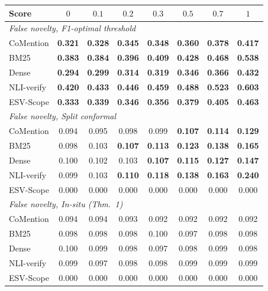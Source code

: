 \setlength{\tabcolsep}{2.5pt}
\begin{tabular}{lccccccc}
\toprule
Score & $0$ & $0.1$ & $0.2$ & $0.3$ & $0.5$ & $0.7$ & $1$ \\
\midrule
\multicolumn{8}{l}{\emph{False novelty, F1-optimal threshold}} \\
CoMention & \textbf{0.321} & \textbf{0.328} & \textbf{0.345} & \textbf{0.348} & \textbf{0.360} & \textbf{0.378} & \textbf{0.417} \\
BM25 & \textbf{0.383} & \textbf{0.384} & \textbf{0.396} & \textbf{0.409} & \textbf{0.428} & \textbf{0.468} & \textbf{0.538} \\
Dense & \textbf{0.294} & \textbf{0.299} & \textbf{0.314} & \textbf{0.319} & \textbf{0.346} & \textbf{0.366} & \textbf{0.432} \\
NLI-verify & \textbf{0.420} & \textbf{0.433} & \textbf{0.446} & \textbf{0.459} & \textbf{0.488} & \textbf{0.523} & \textbf{0.603} \\
ESV-Scope & \textbf{0.333} & \textbf{0.339} & \textbf{0.346} & \textbf{0.356} & \textbf{0.379} & \textbf{0.405} & \textbf{0.463} \\
\multicolumn{8}{l}{\emph{False novelty, Split conformal}} \\
CoMention & 0.094 & 0.095 & 0.098 & 0.099 & \textbf{0.107} & \textbf{0.114} & \textbf{0.129} \\
BM25 & 0.098 & 0.103 & \textbf{0.107} & \textbf{0.113} & \textbf{0.123} & \textbf{0.138} & \textbf{0.165} \\
Dense & 0.100 & 0.102 & 0.103 & \textbf{0.107} & \textbf{0.115} & \textbf{0.127} & \textbf{0.147} \\
NLI-verify & 0.099 & 0.103 & \textbf{0.110} & \textbf{0.118} & \textbf{0.138} & \textbf{0.163} & \textbf{0.240} \\
ESV-Scope & 0.000 & 0.000 & 0.000 & 0.000 & 0.000 & 0.000 & 0.000 \\
\multicolumn{8}{l}{\emph{False novelty, In-situ (Thm.~1)}} \\
CoMention & 0.094 & 0.094 & 0.093 & 0.092 & 0.092 & 0.092 & 0.092 \\
BM25 & 0.098 & 0.098 & 0.098 & 0.100 & 0.097 & 0.098 & 0.098 \\
Dense & 0.100 & 0.099 & 0.098 & 0.097 & 0.098 & 0.099 & 0.098 \\
NLI-verify & 0.099 & 0.097 & 0.098 & 0.098 & 0.099 & 0.099 & 0.099 \\
ESV-Scope & 0.000 & 0.000 & 0.000 & 0.000 & 0.000 & 0.000 & 0.000 \\

\end{tabular}
